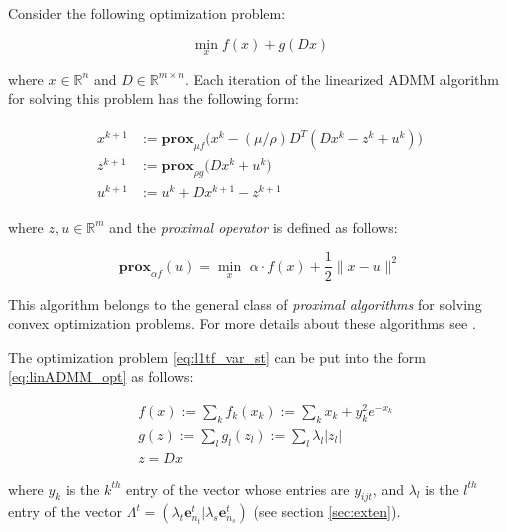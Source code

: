 \documentclass[review]{elsarticle}
\begin{document}
Consider the following optimization problem:

\begin{equation}
\min_x f(x)+g(Dx)
\label{eq:linADMM_opt}
\end{equation} 

\noindent where $x\in \mathbb{R}^n$ and $D\in \mathbb{R}^{m\times n}$. Each iteration of the linearized ADMM algorithm for solving this problem has the following form:

\begin{eqnarray}
\begin{aligned}
x^{k+1} & := \textbf{prox}_{\mu f} \big(x^k - (\mu/\rho)D^T (D x^k − z^k + u^k )\big)\\
z^{k+1} & := \textbf{prox}_{\rho g} \big(D x^k + u^k\big)\\
u^{k+1} & := u^k + D x^{k+1} - z^{k+1}
\end{aligned}
\label{eq:linADMM_steps}
\end{eqnarray}

\noindent where $z,u\in \mathbb{R}^m$ and the \textit{proximal operator} is defined as follows:

\begin{equation}
 \textbf{prox}_{\alpha f}(u) = \min_x \,\, \alpha \cdot f(x)+\frac{1}{2} \lVert x-u \rVert^2
\label{eq:linADMM_prox}
\end{equation}

This algorithm belongs to the general class of \textit{proximal algorithms} for solving convex optimization problems. For more details about these algorithms see \cite{parikh_proximal_2014}. 

The optimization problem \ref{eq:l1tf_var_st} can be put into the form \ref{eq:linADMM_opt} as follows:

\begin{equation}
\begin{aligned}
& f(x):= \sum_{k} f_k(x_k) := \sum_{k}x_k+y_{k}^2e^{-x_{k}}\\
& g(z):= \sum_{l} g_l(z_l) := \sum_{l} \lambda_l |z_l|\\
& z= Dx
\end{aligned}
\label{eq:linADMM_fg}
\end{equation}

\noindent where $y_k$ is the $k^{th}$ entry of the vector whose entries are $y_{ijt}$, and $\lambda_l$ is the $l^{th}$ entry of the vector $\Lambda^t=(\lambda_t\textbf{e}_{n_t}^t|\lambda_s\textbf{e}_{n_s}^t)$ (see section \ref{sec:exten}).
\end{document}
